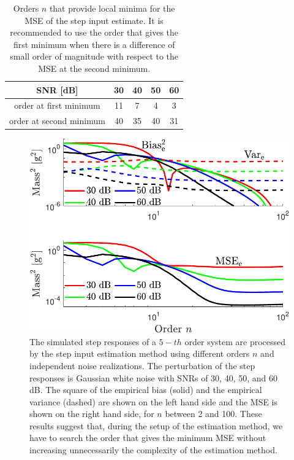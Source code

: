 \begin{table}[!ht]
\caption{ Orders $n$ that provide local minima for the MSE of the step input estimate. It is recommended to use the order that gives the first minimum when there is a difference of small order of magnitude with respect to the MSE at the second minimum.} 
\label{Tbl:orders} 
\centering
\begin{tabular}{c|c c c c} 
\hline
SNR [dB] & 30 & 40 & 50 & 60 \\
\hline
order at first minimum & 11 & 7 & 4 & 3 \\ 
order at second minimum & 40 & 35 & 40 & 31 \\
\hline
\end{tabular}
\end{table}

\begin{figure}[!htbp]
\centering
\includegraphics[width=0.69\columnwidth]{./ChapterExperimentalValidation/fig/Fig_4.pdf} 
\caption{ \label{fig:msee_vs_n_sim} 
The simulated step responses of a $\mathrm{5-}th$ order system are processed by the step input estimation method using different orders $n$ and independent noise realizations. 
The perturbation of the step responses is Gaussian white noise with SNRs of 30, 40, 50, and 60 dB.
The square of the empirical bias (solid) and the empirical variance (dashed) are shown on the left hand side and the MSE is shown on the right hand side, for $n$ between 2 and 100.
These results suggest that, during the setup of the estimation method, we have to search the order that gives the minimum MSE without increasing unnecessarily the complexity of the estimation method.  }
\end{figure}





